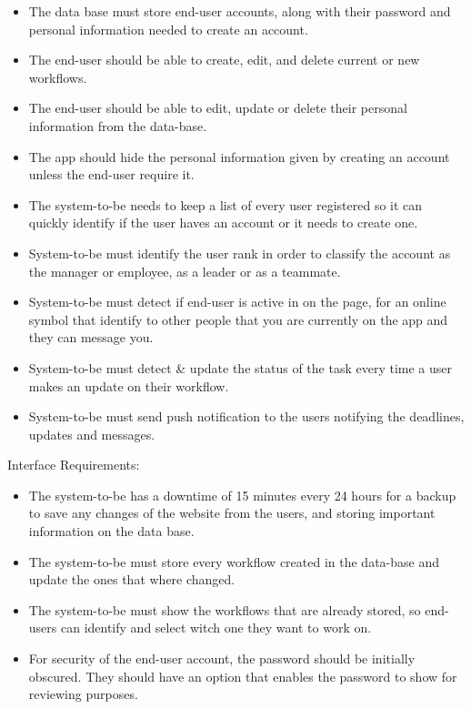 \documentclass{article}
\begin{document}
\begin{itemize}
    \item The data base must store end-user accounts, along with their password and personal information needed to create an account.
    \item The end-user should be able to create, edit, and delete current or new workflows.
    \item The end-user should be able to edit, update or delete their personal information from the data-base.
    \item The app should hide the personal information given by creating an account unless the end-user require it.
    \item The system-to-be needs to keep a list of every user registered so it can quickly identify if the user haves an account or it needs to create one.
    \item System-to-be must identify the user \“rank\” in order to classify the account as the manager or employee, as a leader or as a teammate.
    \item System-to-be must detect if end-user is active in on the page, for an online symbol that identify to other people that you are currently on the app and they can message you.
    \item System-to-be must detect & update the status of the task every time a user makes an update on their workflow.
    \item System-to-be must send push notification to the users notifying the deadlines, updates and messages.
\end{itemize}
\vspace{10}
Interface Requirements:
\begin{itemize}
    \item The system-to-be has a downtime of 15 minutes every 24 hours for a backup to save any changes of the website from the users, and storing important information on the data base.
    \item The system-to-be must store every workflow created in the data-base and update the ones that where changed.
    \item The system-to-be must show the workflows that are already stored, so end-users can identify and select witch one they want to work on.
    \item For security of the end-user account, the password should be initially obscured. They should have an option that enables the password to show for reviewing purposes.
\end{itemize}
\end{document}

